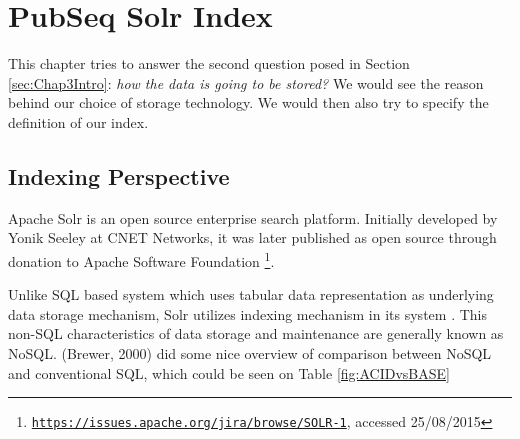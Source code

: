 
\chapter{PubSeq Solr Index} %

\label{Chapter5} %


This chapter tries to answer the second question posed in Section \ref{sec:Chap3Intro}: \textit{how the data is going to be stored?} We would see the reason behind our choice of storage technology. We would then also try to specify the definition of our index.


\section{Indexing Perspective}

Apache Solr is an open source enterprise search platform. Initially developed by Yonik Seeley at CNET Networks, it was later published as open source through donation to Apache Software Foundation \footnote{\href{https://issues.apache.org/jira/browse/SOLR-1}{\texttt{https://issues.apache.org/jira/browse/SOLR-1}}, accessed 25/08/2015}.

Unlike SQL based system which uses tabular data representation as underlying data storage mechanism, Solr utilizes indexing mechanism in its system \citep{smiley2015apache}. This non-SQL characteristics of data storage and maintenance are generally known as NoSQL. (Brewer, 2000) \citep{brewer2000towards} did some nice overview of comparison between NoSQL and conventional SQL, which could be seen on Table \ref{fig:ACIDvsBASE}

